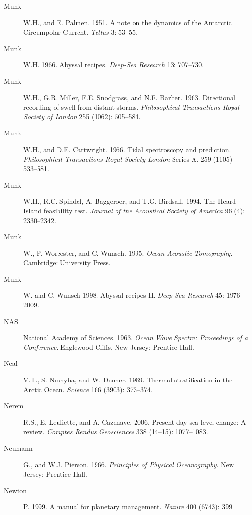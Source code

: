 \begin{description}
\item [Munk]W.H., and E. Palmen. 1951. A note on the dynamics of the
  Antarctic Circumpolar Current. \textit{Tellus} 3: 53--55.

\item [Munk]W.H. 1966. Abyssal recipes. \textit{Deep-Sea Research} 13:
  707--730.

\item [Munk]W.H., G.R. Miller, F.E. Snodgrass, and N.F. Barber. 1963.
  Directional recording of swell from distant
  storms. \textit{Philosophical Transactions Royal Society of London}
  255 (1062): 505--584.

\item [Munk]W.H., and D.E. Cartwright. 1966. Tidal spectroscopy and
  prediction.  \textit{Philosophical Transactions Royal Society
    London} Series A. 259 (1105): 533--581.

\item [Munk]W.H., R.C. Spindel, A. Baggeroer, and
  T.G. Birdsall. 1994. The Heard Island feasibility
  test. \textit{Journal of the Acoustical Society of America} 96 (4):
  2330--2342.

\item [Munk]W., P. Worcester, and C. Wunsch. 1995. \textit{Ocean
  Acoustic Tomography}.  Cambridge: University Press.

\item [Munk]W. and C. Wunsch 1998. Abyssal recipes
  II. \textit{Deep-Sea Research} 45: 1976--2009.

\item [NAS]National Academy of Sciences. 1963. \textit{Ocean Wave
  Spectra: Proceedings of a Conference}.  Englewood Cliffs, New
  Jersey: Prentice-Hall.

\item [Neal]V.T., S. Neshyba, and W. Denner. 1969. Thermal
  stratification in the Arctic Ocean. \textit{Science} 166 (3903):
  373--374.

\item[Nerem]R.S., E. Leuliette, and A. Cazenave. 2006. Present-day
  sea-level change: A review. \textit{Comptes Rendus Geosciences} 338
  (14--15): 1077--1083.
	
\item [Neumann]G., and W.J. Pierson.  1966. \textit{Principles of
  Physical Oceanography}.  New Jersey: Prentice-Hall.

\item [Newton]P. 1999. A manual for planetary
  management. \textit{Nature} 400 (6743): 399.


\end{description}
